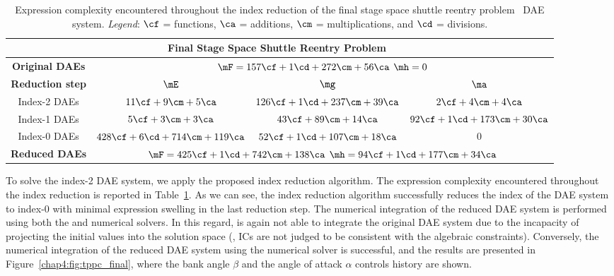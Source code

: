 \begin{table}
  \caption{Expression complexity encountered throughout the index reduction of the final stage space shuttle reentry problem~\cite{brenan1995numerical} \ac{DAE} system. \emph{Legend}: $\cf$ = functions, $\ca$ = additions, $\cm$ = multiplications, and $\cd$ = divisions.}
  \label{chap4:tab:tppc_final}
  \centering
  {\footnotesize\begin{tabular}{cccc}
    \multicolumn{4}{c}{\textbf{Final Stage Space Shuttle Reentry Problem~\cite{brenan1995numerical}}} \\
    \toprule
    \textbf{Original \acp{DAE}} & \multicolumn{3}{c}{$\mF = 157\cf + 1\cd + 272\cm + 56\ca$ \quad $\mh = 0$} \\
    \midrule
    \textbf{Reduction step} & $\mE$ & $\mg$ & $\ma$ \\
    \midrule
    Index-2 \acp{DAE} & $11\cf + 9\cm + 5\ca$ & $126\cf + 1\cd + 237\cm + 39\ca$ & $2\cf + 4\cm + 4\ca$ \\
    Index-1 \acp{DAE} & $5\cf + 3\cm + 3\ca$ & $43\cf + 89\cm + 14\ca$ & $92\cf + 1\cd + 173\cm + 30\ca$ \\
    Index-0 \acp{DAE} & $428\cf + 6\cd + 714\cm + 119\ca$ & $52\cf + 1\cd + 107\cm + 18\ca$ & $0$ \\
    \midrule
    \textbf{Reduced \acp{DAE}} & \multicolumn{3}{c}{$\mF = 425\cf + 1\cd + 742\cm + 138\ca$ \quad $\mh = 94\cf + 1\cd + 177\cm + 34\ca$} \\
    \bottomrule
  \end{tabular}}
\end{table}

To solve the index-2 \ac{DAE} system, we apply the proposed index reduction algorithm. The expression complexity encountered throughout the index reduction is reported in Table~\ref{chap4:tab:tppc_final}. As we can see, the index reduction algorithm successfully reduces the index of the \ac{DAE} system to index-0 with minimal expression swelling in the last reduction step. The numerical integration of the reduced \ac{DAE} system is performed using both the \Maple{} and \Indigo{} numerical solvers. In this regard, \Maple{} is again not able to integrate the original \ac{DAE} system due to the incapacity of projecting the initial values into the solution space (\ie{}, \acp{IC} are not judged to be consistent with the algebraic constraints). Conversely, the numerical integration of the reduced \ac{DAE} system using the \Indigo{} numerical solver is successful, and the results are presented in Figure~\ref{chap4:fig:tppc_final}, where the bank angle $\beta$ and the angle of attack $\alpha$ controls history are shown.

